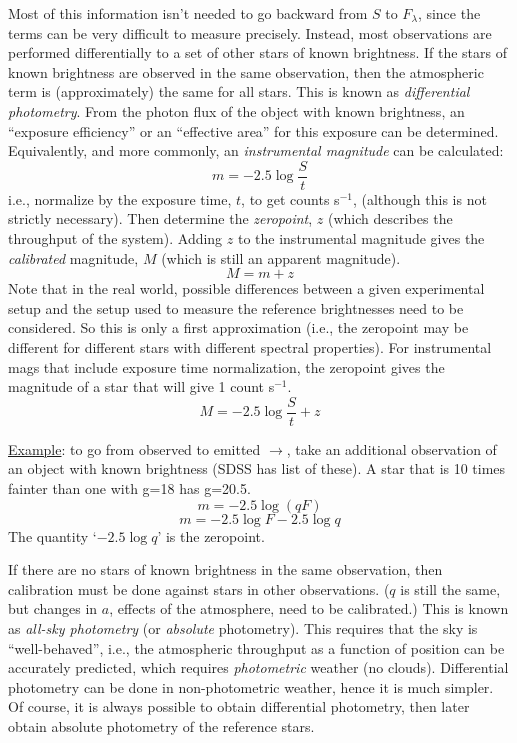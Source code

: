 \documentclass[12pt]{article}
\newcommand{\mynotes}[1]{\textcolor{myBlue}{#1}}
\begin{document}
Most of this information isn't needed to go backward from $S$ to $F_{\lambda}$,
since the terms can be very difficult to measure precisely. Instead, most
observations are performed differentially to a set of other stars of known
brightness. If the stars of known brightness are observed in the same
observation, then the atmospheric term is (approximately) the same for all
stars. This is known as \textit{differential photometry}. From the photon flux
of the object with known brightness, an ``exposure efficiency'' or an
``effective area'' for this exposure can be determined. Equivalently, and more
commonly, an \textit{instrumental magnitude} can be calculated:
\[
    m = -2.5 \log \frac{S}{t}
    \]
i.e., normalize by the exposure time, $t$, to get counts s$^{-1}$, (although
this is not strictly necessary). Then determine the \textit{zeropoint}, $z$
\mynotes{(which describes the throughput of the system)}. Adding $z$ to the
instrumental magnitude gives the \textit{calibrated} magnitude, $M$ (which is
still an apparent magnitude).
\[
    M = m + z
    \]
Note that in the real world, possible
differences between a given experimental setup and the setup used to
measure the reference brightnesses need to be considered.
So this is only a first
approximation (i.e., the zeropoint may be different for different
stars with different spectral properties). For instrumental mags
that include exposure time normalization, the zeropoint gives the
magnitude of a star that will give 1 count s$^{-1}$.
\[
    M = -2.5\log\frac{S}{t} + z
    \]
\begin{framed}
    \underline{Example}: to go from observed to emitted $\rightarrow$,
    take an additional observation of an object with known brightness
    (SDSS has list of these).
    A star that is 10 times fainter than one with g=18 has g=20.5.
    \[
        m = -2.5 \log(qF)
        \]
    \[
        m = -2.5 \log F - 2.5\log q
        \]
    The quantity `$-2.5\log q$' is the zeropoint.
\end{framed}
If there are no stars of known brightness in the same observation, then
calibration must be done against stars in other observations. \mynotes{($q$ is
still the same, but changes in $a$, effects of the atmosphere, need to be
calibrated.)} This is known as \textit{all-sky photometry} (or
\textit{absolute} photometry). This requires that the sky is ``well-behaved'',
i.e., the atmospheric throughput as a function of position can be accurately
predicted, which requires \textit{photometric} weather (no clouds).
Differential photometry can be done in non-photometric weather, hence it is
much simpler. Of course, it is always possible to obtain differential
photometry, then later obtain absolute photometry of the reference stars.
\end{document}
